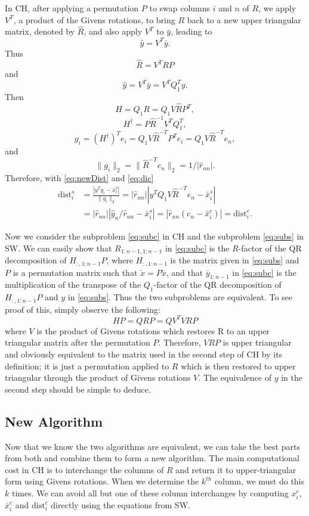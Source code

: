 \documentclass[12pt,Bold,letterpaper]{mcgilletdclass}
\newcommand{\dist}{\mathrm{dist}}
\newcommand{\vsp}{\vspace{\baselineskip}}
\begin{document}
In CH, after applying a permutation $P$ to swap columns $i$ and $n$ of $R$,  
we apply $V^T$, a product of the Givens rotations, to bring $R$ back to a new upper triangular
matrix, denoted by $\hat{R}$, and also apply $V^T$ to $\bar{y}$, 
leading to  $$\hat{y} = V^T\bar{y}.$$
Thus  $$\hat{R}=V^T RP$$ and $$\hat{y} = V^T\bar{y}=V^TQ_1^Ty.$$
Then $$H=Q_1R= Q_1V\hat{R}P^T,$$ $$H^\dag= P\hat{R}^{-1}V^TQ_1^T,$$ 
$$g_i=(H^\dag)^Te_i=Q_1V\hat{R}^{-T}P^Te_i=Q_1V\hat{R}^{-T}e_n,$$
and $$\|g_i\|_2=\|\hat{R}^{-T}e_n\|_2=1/|\hat{r}_{nn}|.$$
Therefore, with \eqref{eq:newDist} and \eqref{eq:dic}
\begin{align}
\dist_i^s
&=\frac{ | y^Tg_i - \bar{x}_i^s   |}{  \| g_i   \|_2} 
=|\hat{r}_{nn}||y^TQ_1V\hat{R}^{-T}e_n- \bar{x}_i^s  |  \label{eq:disc} \\
& = |\hat{r}_{nn}|| \hat{y}_n/\hat{r}_{nn} - \bar{x}_i^s | 
 = |\hat{r}_{nn}(c_n-\bar{x}_i^c)| =\dist_i^c.  \nonumber
\end{align}

Now we consider  the subproblem \eqref{eq:subc} in CH and the subproblem \eqref{eq:subs} in SW.
We can easily show that $R_{1:n-1,1:n-1}$ in  \eqref{eq:subc} is the $R$-factor of the QR decomposition
of $H_{:,1:n-1}P$, where $H_{:,1:n-1}$ is the matrix given in \eqref{eq:subs}
and $P$ is a permutation matrix such that $\check{x}=P\tilde{x}$,
and that $\bar{y}_{1:n-1}$ in  \eqref{eq:subc} is the multiplication of the transpose of 
the $Q_1$-factor of the QR decomposition of $H_{:,1:n-1}P$ and $y$ in \eqref{eq:subs}.
Thus the two subproblems are equivalent. To see proof of this, simply observe the following:
$$
HP = QRP = QV^TVRP
$$
where $V$ is the product of Givens rotations which restores R to an upper triangular matrix after the permutation $P$. Therefore, $VRP$ is upper triangular and obviously equivalent to the matrix used in the second step of CH by its definition; it is just a permutation applied to $R$ which is then restored to upper triangular through the product of Givens rotations $V$. The equivalence of $y$ in the second step should be simple to deduce.

\vsp \subsection{New Algorithm} \label{subsec:newReduction}
Now that we know the two algorithms are equivalent, we can take the best
parts from both and combine them to form a new algorithm. 
The main computational cost in CH is to interchange the columns of $R$ and return it to
upper-triangular form using Givens rotations. 
When we determine the $k^{th}$ column,  we must do this $k$ times. 
We can avoid all but one of these column interchanges by computing $x_i^c$, 
$\bar{x}_i^c$ and $\dist_i^c$ directly using the equations from SW. 
\end{document}
